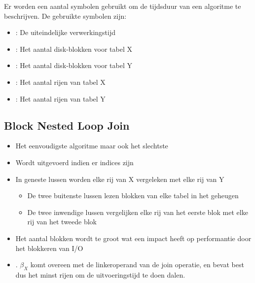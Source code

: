 \documentclass{article}
\begin{document}
Er worden een aantal symbolen gebruikt om de tijdsduur van een algoritme te beschrijven. De gebruikte symbolen zijn:
\begin{itemize}
	\item {: De uiteindelijke verwerkingstijd}
	\item {: Het aantal disk-blokken voor tabel X}
	\item {: Het aantal disk-blokken voor tabel Y}
	\item {: Het aantal rijen van tabel X}
	\item {: Het aantal rijen van tabel Y}
\end{itemize}
\subsection{Block Nested Loop Join}
\begin{itemize}
	\item {Het eenvoudigste algoritme maar ook het slechtste}
	\item {Wordt uitgevoerd indien er  indices zijn}
	\item {In  geneste lussen worden elke rij van X vergeleken met elke rij van Y
		\begin{itemize}
			\item {De twee buitenste lussen lezen blokken van elke tabel in het geheugen}
			\item {De twee inwendige lussen vergelijken elke rij van het eerste blok met elke rij van het tweede blok}
		\end{itemize}
	}
	\item {Het aantal blokken wordt te groot wat een impact heeft op performantie door het blokkeren van I/O}
	      \item{. $\beta_X$ komt overeen met de linkeroperand van de join operatie, en bevat best dus het minst rijen om de uitvoeringstijd te doen dalen.}
\end{itemize}
  
\end{document}
